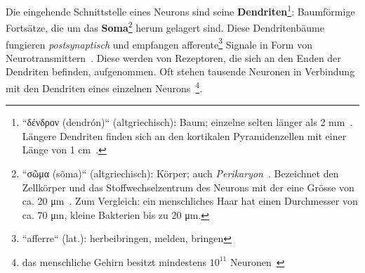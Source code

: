 Die eingehende Schnittstelle eines Neurons sind seine \textbf{Dendriten}\footnote{
 ``\textgreek{δένδρον} (dendrón)`` (altgriechisch): Baum; einzelne selten länger als 2 mm~\cite[28]{BCP18}. Längere Dendriten finden sich an den kortikalen Pyramidenzellen mit einer Länge von 1 cm~\cite[58]{Eil19}.
}: Baumförmige Fortsätze, die um das \textbf{Soma}\footnote{
  ``\textgreek{σῶμα} (sõma)`` (altgriechisch): Körper; auch \textit{Perikaryon}~\cite[58]{RK18}. Bezeichnet den Zellkörper und das Stoffwechselzentrum des Neurons mit der eine Grösse von ca. 20 μm~\cite[29]{BCP18}. Zum Vergleich: ein menschliches Haar hat einen Durchmesser von ca. 70 μm, kleine Bakterien bis zu 20 μm.
} herum gelagert sind.
Diese Dendritenbäume~\cite[47]{BCP18} fungieren \textit{postsynaptisch} und empfangen afferente\footnote{
  ``afferre`` (lat.): herbeibringen, melden, bringen
} Signale in Form von Neurotransmittern~\cite[61]{Eil19}.
Diese werden von Rezeptoren, die sich an den Enden der Dendriten befinden, aufgenommen.
Oft stehen tausende Neuronen in Verbindung mit den Dendriten eines einzelnen Neurons~\cite[42]{SD07}\footnote{
 das menschliche Gehirn besitzt mindestens $10^{11}$ Neuronen~\cite[175]{KSJ+13}
}.\\


